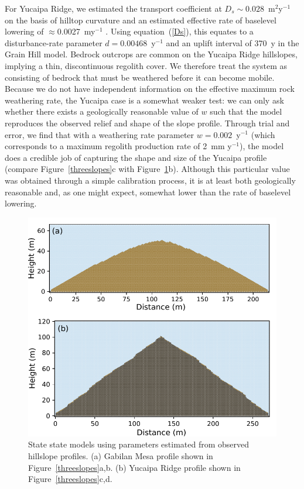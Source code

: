 \documentclass[esurf, manuscript]{copernicus}
\begin{document}
For Yucaipa Ridge, we estimated the transport coefficient at $D_s\sim0.028$~m$^2$y$^{-1}$ on the basis of hilltop curvature and an estimated effective rate of baselevel lowering of  $\approx$0.0027~my$^{-1}$ \citep{binnie2007tectonic}. Using equation~(\ref{Ds}), this equates to a disturbance-rate parameter $d=0.00468$~y$^{-1}$ and an uplift interval of 370~y in the Grain Hill model. Bedrock outcrops are common on the Yucaipa Ridge hillslopes, implying a thin, discontinuous regolith cover. We therefore treat the system as consisting of bedrock that must be weathered before it can become mobile. Because we do not have independent information on the effective maximum rock weathering rate, the Yucaipa case is a somewhat weaker test: we can only ask whether there exists a geologically reasonable value of $w$ such that the model reproduces the observed relief and shape of the slope profile. Through trial and error, we find that with a weathering rate parameter $w=0.002$~y$^{-1}$ (which corresponds to a maximum regolith production rate of 2~mm y$^{-1}$), the model does a credible job of capturing the shape and size of the Yucaipa profile (compare Figure~\ref{threeslopes}c with Figure~\ref{simprofiles}b). Although this particular value was obtained through a simple calibration process, it is at least both geologically reasonable and, as one might expect, somewhat lower than the rate of baselevel lowering.

\begin{figure}[t]
\includegraphics{Figures/sim_field_profiles.pdf}
\caption{State state models using parameters estimated from observed hillslope profiles. (a) Gabilan Mesa profile shown in Figure~\ref{threeslopes}a,b. (b) Yucaipa Ridge profile shown in Figure~\ref{threeslopes}c,d.}
\label{simprofiles}
\end{figure}
\end{document}
